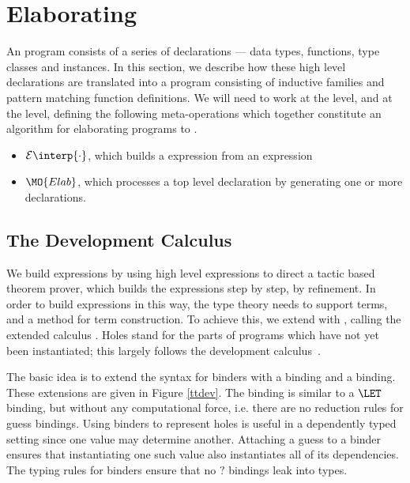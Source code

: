 \newcommand{\ttinterp}[1]{\mathcal{E}\interp{#1}}

\section{Elaborating \Idris{}}

An \Idris{} program consists of a series of declarations --- data types, functions,
type classes and instances. In this section, we describe how these high level declarations
are translated into a \TT{} program consisting of inductive families and pattern matching
function definitions. We will need to work at the  level, and at
the  level, defining the following meta-operations
which together constitute an algorithm for elaborating \Idris{}
programs to \TT{}.

\begin{itemize}
\item $\ttinterp{\cdot}$, which builds a \TT{} expression from an \Idris{} expression
\item $\MO{Elab}$, which processes a top level \Idris{} declaration by generating
one or more \TT{} declarations.
\end{itemize}


\subsection{The Development Calculus \TTdev}

We build \TT{} expressions by using high level \Idris{} expressions to
direct a tactic based theorem prover, which builds the \TT{} expressions
step by step, by refinement. In order to build expressions in this way,
the type theory needs to support
 terms, and a method for term construction. 
To achieve this, we extend \TT{} with ,
calling the extended calculus \TTdev{}.
Holes stand for the parts of programs which have not yet been
instantiated; this largely follows the \Oleg{} development
calculus~\cite{McBride1999}.

The basic idea is to extend the syntax for binders with a 
binding and a  binding. 
These extensions are given in Figure \ref{ttdev}.
The  binding is
similar to a $\LET$ binding, but without any computational force,
i.e. there are no reduction rules for guess bindings. 
Using binders to represent holes is useful in a dependently typed setting since
one value may determine another. Attaching a guess to a binder ensures that
instantiating one such value also instantiates all of its dependencies. The
typing rules for binders ensure that no $?$ bindings leak into types.

